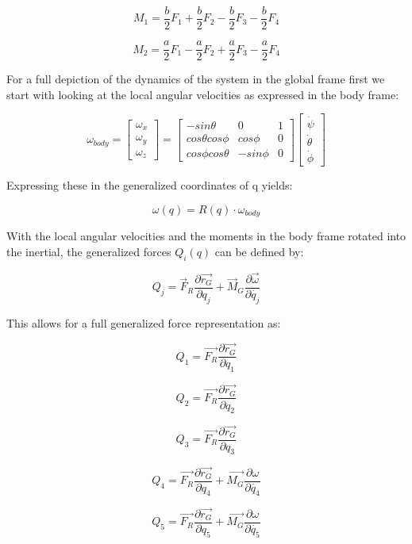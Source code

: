 \documentclass[10pt, letterpaper]{article}
\begin{document}
\[
M_{1}=\frac{b}{2}F_{1}+\frac{b}{2}F_{2}-\frac{b}{2}F_{3}-\frac{b}{2}F_{4}
\]

\[
M_{2}=\frac{a}{2}F_{1}-\frac{a}{2}F_{2}+\frac{a}{2}F_{3}-\frac{a}{2}F_{4}
\]

For a full depiction of the dynamics of the system in the global frame
first we start with looking at the local angular velocities as expressed
in the body frame:

\[
\omega_{body}=\left[\begin{array}{c}
\omega_{x}\\
\omega_{y}\\
\omega_{z}
\end{array}\right]=\left[\begin{array}{ccc}
-sin\theta & 0 & 1\\
cos\theta cos\phi & cos\phi & 0\\
cos\phi cos\theta & -sin\phi & 0
\end{array}\right]\left[\begin{array}{c}
\dot{\psi}\\
\dot{\theta}\\
\dot{\phi}
\end{array}\right]
\]

Expressing these in the generalized coordinates of q yields:

\[
\omega(q)=R(q)\cdot\omega_{body}
\]

With the local angular velocities and the moments in the body frame
rotated into the inertial, the generalized forces $Q_{i}$$(q)$ can
be defined by:

\[
Q_{j}=\overrightarrow{F}_{R}\frac{\partial\overrightarrow{r_{G}}}{\partial q_{j}}+\overrightarrow{M}_{G}\frac{\partial\overrightarrow{\omega}}{\partial\dot{q_{j}}}
\]

This allows for a full generalized force representation as:

\[
Q_{1}=\overrightarrow{F_{R}}\frac{\partial\overrightarrow{r_{G}}}{\partial q_{1}}
\]

\[
Q_{2}=\overrightarrow{F_{R}}\frac{\partial\overrightarrow{r_{G}}}{\partial q_{2}}
\]

\[
Q_{3}=\overrightarrow{F_{R}}\frac{\partial\overrightarrow{r_{G}}}{\partial q_{3}}
\]

\[
Q_{4}=\overrightarrow{F_{R}}\frac{\partial\overrightarrow{r_{G}}}{\partial q_{4}}+\overrightarrow{M_{G}}\frac{\partial\omega}{\partial\dot{q_{4}}}
\]

\[
Q_{5}=\overrightarrow{F_{R}}\frac{\partial\overrightarrow{r_{G}}}{\partial q_{5}}+\overrightarrow{M_{G}}\frac{\partial\omega}{\partial\dot{q_{5}}}
\]
\end{document}
